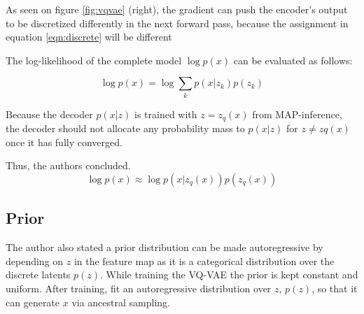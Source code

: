 As seen on figure \ref{fig:vqvae} (right), the gradient can push the encoder’s output to be discretized 
differently in the next forward pass, because the assignment in equation \ref{eqn:discrete} will be different

The log-likelihood of the complete model $\log p(x)$ can be evaluated as follows:

\begin{equation}
    \log p(x) = \log \sum _k p(x|z _k) p(z _k)
    \label{eqn:modellog}
\end{equation}

Because the decoder $p(x|z)$ is trained with $z = z _q(x)$ from MAP-inference, the decoder
should not allocate any probability mass to $p(x|z)$ for $z \neq zq(x)$ once it has fully converged.

Thus, the authors concluded.~\cite{razavi2019generating, oord2018neural}
\begin{equation}
    \log p(x) \approx \log p(x|z _q(x))p(z _q(x))
\end{equation}

\subsection{Prior}

The author also stated a prior distribution can be made autoregressive by depending on $z$ 
in the feature map as it is a categorical distribution over the discrete latents $p(z)$. 
While training the VQ-VAE the prior is kept constant and uniform. After training, fit 
an autoregressive distribution over $z$, $p(z)$, so that it can generate $x$ via ancestral sampling.

